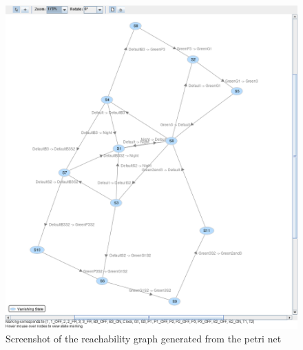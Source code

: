 \documentclass[letterpaper,12pt]{article}
\begin{document}
\begin{figure}[H]
 \centering
 \includegraphics[width=\textwidth]{reachabilitygraph.png}
 \caption{Screenshot of the reachability graph generated from the petri net}
\end{figure}
\end{document}

